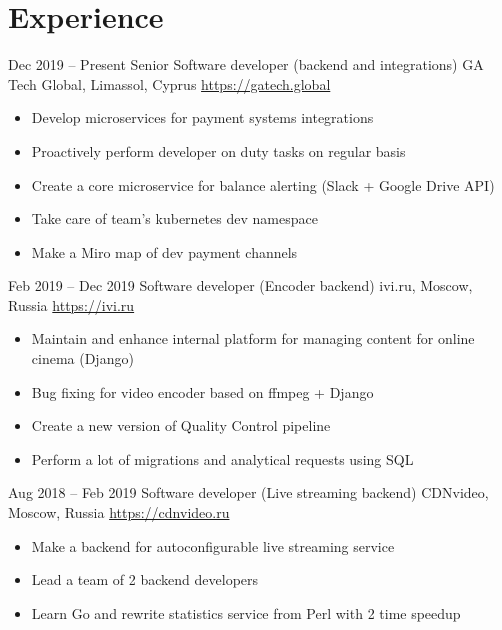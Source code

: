 \documentclass[11pt,a4paper]{moderncv}
\begin{document}
\maketitle
\vspace*{-5mm}

\section{Experience}
  \cventry
    {Dec 2019 – Present}
    {Senior Software developer (backend and integrations)}
    {GA Tech Global, Limassol, Cyprus}
    {\url{https://gatech.global}}
    {}
    {
      \begin{itemize}\setlength\itemindent{6pt}
        \item Develop microservices for payment systems integrations
        \item Proactively perform developer on duty tasks on regular basis
        \item Create a core microservice for balance alerting (Slack + Google Drive API)
        \item Take care of team's kubernetes dev namespace
        \item Make a Miro map of dev payment channels
      \end{itemize}
    }

  \cventry
    {Feb 2019 – Dec 2019}
    {Software developer (Encoder backend)}
    {ivi.ru, Moscow, Russia}
    {\url{https://ivi.ru}}
    {}
    {
      \begin{itemize}\setlength\itemindent{6pt}
        \item Maintain and enhance internal platform for managing content for online cinema (Django)
        \item Bug fixing for video encoder based on ffmpeg + Django
        \item Create a new version of Quality Control pipeline
        \item Perform a lot of migrations and analytical requests using SQL
      \end{itemize}
    }

  \cventry
    {Aug 2018 – Feb 2019}
    {Software developer (Live streaming backend)}
    {CDNvideo, Moscow, Russia}
    {\url{https://cdnvideo.ru}}
    {}
    {
      \begin{itemize}\setlength\itemindent{6pt}
        \item Make a backend for autoconfigurable live streaming service
        \item Lead a team of 2 backend developers
        \item Learn Go and rewrite statistics service from Perl with 2 time speedup
      \end{itemize}
    }
\end{document}
